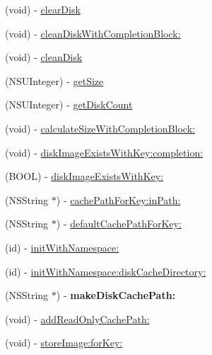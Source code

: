 \begin{DoxyCompactItemize}
(void) -\/ \mbox{\hyperlink{interface_s_d_image_cache_a2a9bcc872d749959df5dd458247b3301}{clear\+Disk}}
\item 
(void) -\/ \mbox{\hyperlink{interface_s_d_image_cache_a1f82c522f4cb0fafdb063291cbcb23d0}{clean\+Disk\+With\+Completion\+Block\+:}}
\item 
(void) -\/ \mbox{\hyperlink{interface_s_d_image_cache_a491f75cc5c1df37dce478c00f898a0d8}{clean\+Disk}}
\item 
(N\+S\+U\+Integer) -\/ \mbox{\hyperlink{interface_s_d_image_cache_a934d85543e92fdb3ac35cbdff3e668d3}{get\+Size}}
\item 
(N\+S\+U\+Integer) -\/ \mbox{\hyperlink{interface_s_d_image_cache_abc59ee03f3afc7d9fa202a0790f8b5c0}{get\+Disk\+Count}}
\item 
(void) -\/ \mbox{\hyperlink{interface_s_d_image_cache_a276a37cdab08d116906f65040bad9c99}{calculate\+Size\+With\+Completion\+Block\+:}}
\item 
(void) -\/ \mbox{\hyperlink{interface_s_d_image_cache_a2baefc1300fcd3c57a25b5326dda8834}{disk\+Image\+Exists\+With\+Key\+:completion\+:}}
\item 
(B\+O\+OL) -\/ \mbox{\hyperlink{interface_s_d_image_cache_a67feea7b5568f427dfcf4f380abc1ba7}{disk\+Image\+Exists\+With\+Key\+:}}
\item 
(N\+S\+String $\ast$) -\/ \mbox{\hyperlink{interface_s_d_image_cache_a8dffa7933d6dcd6668331d03d29e2ad0}{cache\+Path\+For\+Key\+:in\+Path\+:}}
\item 
(N\+S\+String $\ast$) -\/ \mbox{\hyperlink{interface_s_d_image_cache_a591ff2cb8bcd813969b33c610c569bdc}{default\+Cache\+Path\+For\+Key\+:}}
\item 
(id) -\/ \mbox{\hyperlink{interface_s_d_image_cache_a586dcc0a4f8b68e5866b8d2c7bdce7db}{init\+With\+Namespace\+:}}
\item 
(id) -\/ \mbox{\hyperlink{interface_s_d_image_cache_a92cb9299f37364e27e59f5379b076e05}{init\+With\+Namespace\+:disk\+Cache\+Directory\+:}}
\item 
\mbox{\label{interface_s_d_image_cache_a48625e7237af6b6b4cc6c52ee8a661b0}} 
(N\+S\+String $\ast$) -\/ {\bfseries make\+Disk\+Cache\+Path\+:}
\item 
(void) -\/ \mbox{\hyperlink{interface_s_d_image_cache_a9bfedcc9878284b76502287b4b16c1a6}{add\+Read\+Only\+Cache\+Path\+:}}
\item 
(void) -\/ \mbox{\hyperlink{interface_s_d_image_cache_a28d995cab90e214dc5603403a7ed7753}{store\+Image\+:for\+Key\+:}}

\end{DoxyCompactItemize}
